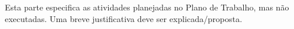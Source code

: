 Esta parte especifica as atividades planejadas no Plano de Trabalho, mas não
executadas. Uma breve justificativa deve ser explicada/proposta.
